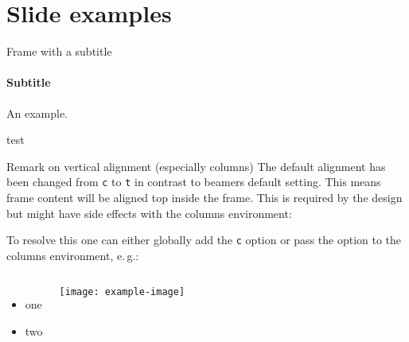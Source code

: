 \documentclass[
	english, %
	design=2023, %
	]{tudabeamer}
\newcommand*{\code}[1]{\texttt{#1}}
\begin{document}
\section{Slide examples}

\begin{frame}{Frame with a subtitle}
\framesubtitle{Subtitle}
An example.
\end{frame}

\textcolor{TUDa-dark1}{test}


\begin{frame}{Remark on vertical alignment (especially columns)}
	The default alignment has been changed from \code{c} to \code{t} in contrast to beamers default setting.
	This means frame content will be aligned top inside the frame. 
	This is required by the design but might have side effects with the columns environment:
	
	To resolve this one can either globally add the \code{c} option or pass the option to the columns environment, e.\,g.:

\begin{columns}[onlytextwidth,c]
	\begin{itemize}
		\item one
		\item two
	\end{itemize}
	\texttt{[image: example-image]}
\end{columns}
\end{frame}
\end{document}
